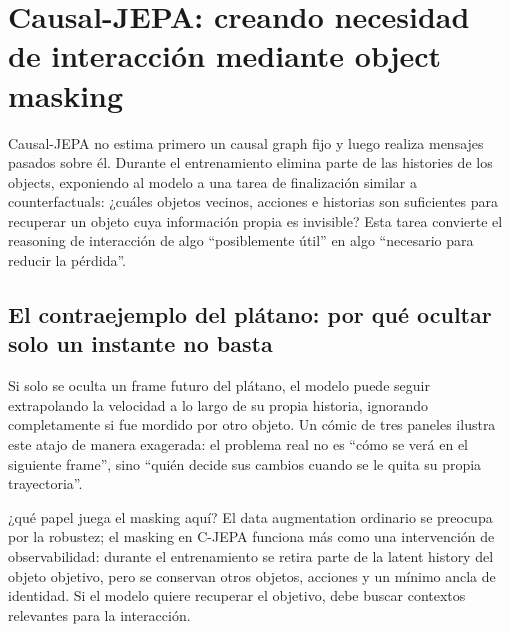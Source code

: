 \section{Causal-JEPA: creando necesidad de interacción mediante object masking}

Causal-JEPA no estima primero un causal graph fijo y luego realiza mensajes pasados sobre él. Durante el entrenamiento elimina parte de las histories de los objects, exponiendo al modelo a una tarea de finalización similar a counterfactuals: ¿cuáles objetos vecinos, acciones e historias son suficientes para recuperar un objeto cuya información propia es invisible? Esta tarea convierte el reasoning de interacción de algo ``posiblemente útil'' en algo ``necesario para reducir la pérdida''.

\subsection{El contraejemplo del plátano: por qué ocultar solo un instante no basta}

Si solo se oculta un frame futuro del plátano, el modelo puede seguir extrapolando la velocidad a lo largo de su propia historia, ignorando completamente si fue mordido por otro objeto. Un cómic de tres paneles ilustra este atajo de manera exagerada: el problema real no es ``cómo se verá en el siguiente frame'', sino ``quién decide sus cambios cuando se le quita su propia trayectoria''.



\begin{importantbox}{¿qué papel juega el masking aquí?}
El data augmentation ordinario se preocupa por la robustez; el masking en C-JEPA funciona más como una intervención de observabilidad: durante el entrenamiento se retira parte de la latent history del objeto objetivo, pero se conservan otros objetos, acciones y un mínimo ancla de identidad. Si el modelo quiere recuperar el objetivo, debe buscar contextos relevantes para la interacción.
\end{importantbox}

